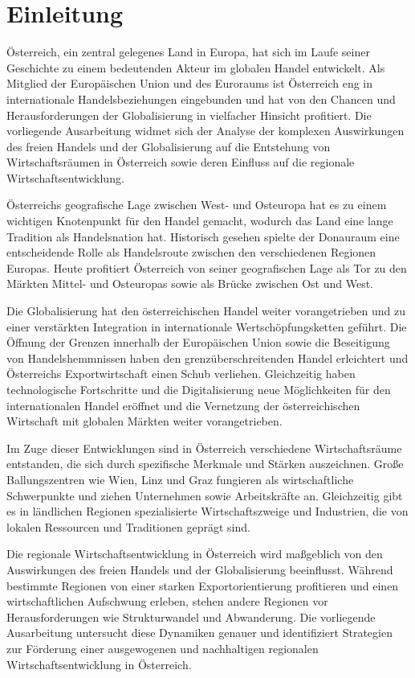 \section{Einleitung}

Österreich, ein zentral gelegenes Land in Europa, hat sich im Laufe seiner Geschichte zu einem bedeutenden Akteur im globalen Handel entwickelt. Als Mitglied der Europäischen Union und des Euroraums ist Österreich eng in internationale Handelsbeziehungen eingebunden und hat von den Chancen und Herausforderungen der Globalisierung in vielfacher Hinsicht profitiert. Die vorliegende Ausarbeitung widmet sich der Analyse der komplexen Auswirkungen des freien Handels und der Globalisierung auf die Entstehung von Wirtschaftsräumen in Österreich sowie deren Einfluss auf die regionale Wirtschaftsentwicklung.

Österreichs geografische Lage zwischen West- und Osteuropa hat es zu einem wichtigen Knotenpunkt für den Handel gemacht, wodurch das Land eine lange Tradition als Handelsnation hat. Historisch gesehen spielte der Donauraum eine entscheidende Rolle als Handelsroute zwischen den verschiedenen Regionen Europas. Heute profitiert Österreich von seiner geografischen Lage als Tor zu den Märkten Mittel- und Osteuropas sowie als Brücke zwischen Ost und West.

Die Globalisierung hat den österreichischen Handel weiter vorangetrieben und zu einer verstärkten Integration in internationale Wertschöpfungsketten geführt. Die Öffnung der Grenzen innerhalb der Europäischen Union sowie die Beseitigung von Handelshemmnissen haben den grenzüberschreitenden Handel erleichtert und Österreichs Exportwirtschaft einen Schub verliehen. Gleichzeitig haben technologische Fortschritte und die Digitalisierung neue Möglichkeiten für den internationalen Handel eröffnet und die Vernetzung der österreichischen Wirtschaft mit globalen Märkten weiter vorangetrieben.

Im Zuge dieser Entwicklungen sind in Österreich verschiedene Wirtschaftsräume entstanden, die sich durch spezifische Merkmale und Stärken auszeichnen. Große Ballungszentren wie Wien, Linz und Graz fungieren als wirtschaftliche Schwerpunkte und ziehen Unternehmen sowie Arbeitskräfte an. Gleichzeitig gibt es in ländlichen Regionen spezialisierte Wirtschaftszweige und Industrien, die von lokalen Ressourcen und Traditionen geprägt sind.

Die regionale Wirtschaftsentwicklung in Österreich wird maßgeblich von den Auswirkungen des freien Handels und der Globalisierung beeinflusst. Während bestimmte Regionen von einer starken Exportorientierung profitieren und einen wirtschaftlichen Aufschwung erleben, stehen andere Regionen vor Herausforderungen wie Strukturwandel und Abwanderung. Die vorliegende Ausarbeitung untersucht diese Dynamiken genauer und identifiziert Strategien zur Förderung einer ausgewogenen und nachhaltigen regionalen Wirtschaftsentwicklung in Österreich.
